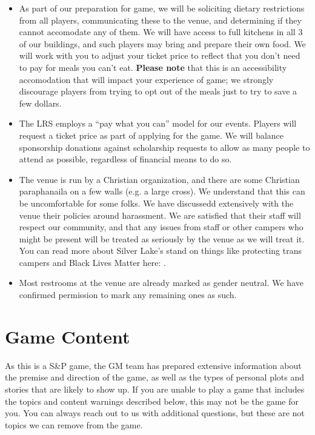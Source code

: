 \documentclass[sheet]{GL2020}
\begin{document}
\begin{itemize}
  \item As part of our preparation for game, we will be soliciting dietary restrictions from all players, communicating these to the venue, and determining if they cannot accomodate any of them. We will have access to full kitchens in all 3 of our buildings, and such players may bring and prepare their own food. We will work with you to adjust your ticket price to reflect that you don't need to pay for meals you can't eat. \textbf{Please note} that this is an accessibility accomodation that will impact your experience of game; we strongly discourage players from trying to opt out of the meals just to try to save a few dollars.
  \item The LRS employs a ``pay what you can'' model for our events. Players will request a ticket price as part of applying for the game. We will balance sponsorship donations against scholarship requests to allow as many people to attend as possible, regardless of financial means to do so.
  \item The venue is run by a Christian organization, and there are some Christian paraphanaila on a few walls (e.g. a large cross). We understand that this can be uncomfortable for some folks. We have discussedd extensively with the venue their policies around harassment. We are satisfied that their staff will respect our community, and that any issues from staff or other campers who might be present will be treated as seriously by the venue as we will treat it. You can read more about Silver Lake's stand on things like protecting trans campers and Black Lives Matter here: \url{}.
  \item Most restrooms at the venue are already marked as gender neutral. We have confirmed permission to mark any remaining ones as such.
\end{itemize}

\section{Game Content}
As this is a S\&P game, the GM team has prepared extensive information about the premise and direction of the game, as well as the types of personal plots and stories that are likely to show up. If you are unable to play a game that includes the topics and content warnings described below, this may not be the game for you. You can always reach out to us with additional questions, but these are not topics we can remove from the game.
\end{document}

